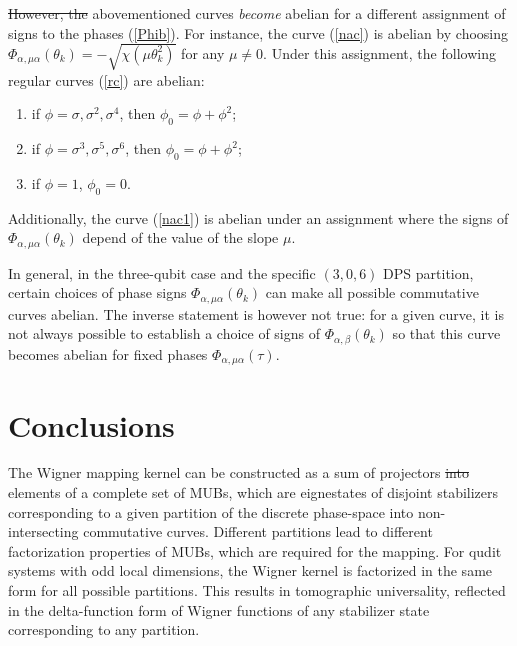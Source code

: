 \documentclass[quantumrep,article,submit,pdftex,moreauthors]{Definitions/mdpi}
\providecommand{\DIFadd}[1]{{\protect\color{blue}\uwave{#1}}} %
\providecommand{\DIFdel}[1]{{\protect\color{red}\sout{#1}}}                      %
\providecommand{\DIFaddbegin}{} %
\providecommand{\DIFaddend}{} %
\providecommand{\DIFdelbegin}{} %
\providecommand{\DIFdelend}{} %
\begin{document}
\DIFdelbegin \DIFdel{However, the }\DIFdelend \DIFaddbegin \DIFadd{The }\DIFaddend abovementioned curves \textit{become} abelian for a different assignment of
signs to the phases (\ref{Phib}). For instance, the curve (\ref{nac}) is abelian
by choosing $\Phi_{\alpha,\mu \alpha }(\theta_{k}) = -\sqrt{\chi\left(\mu
\theta_{k}^{2}\right)}$ for any $\mu \neq 0$. Under this assignment, the
following regular curves (\ref{rc}) are abelian:

\begin{enumerate}
  \item if $\phi = \sigma, \sigma^{2}, \sigma^{4}$, then $\phi_{0} = \phi +
    \phi^{2}$;

\DIFaddbegin 

  \DIFaddend \item if $\phi = \sigma^{3}, \sigma^{5}, \sigma^{6}$, then $\phi_{0} = \phi +
    \phi^{2}$;

\DIFaddbegin 

  \DIFaddend \item if $\phi = 1$, $\phi_{0} = 0$.
\end{enumerate}

Additionally, the curve (\ref{nac1}) is abelian under an assignment where the
signs of $\Phi_{\alpha,\mu \alpha}(\theta_{k})$ depend of the value of the slope
$\mu$.

In general, in the three-qubit case and the specific $(3,0,6)$ DPS partition,
certain choices of phase signs $\Phi_{\alpha,\mu \alpha}(\theta_{k})$ can make
all possible commutative curves abelian. The inverse statement is however not
true: for a given curve, it is not always possible to establish a choice of
signs of $\Phi_{\alpha,\beta }(\theta_{k})$ so that this curve becomes abelian
for fixed phases $\Phi_{\alpha,\mu \alpha}(\tau)$.


\DIFaddbegin 

\DIFaddend \section{Conclusions}

The Wigner mapping kernel can be constructed as a sum of projectors \DIFdelbegin \DIFdel{into
}\DIFdelend \DIFaddbegin \DIFadd{onto
}\DIFaddend elements of a complete set of MUBs, which are eignestates of disjoint
stabilizers corresponding to a given partition of the discrete phase-space into
non-intersecting commutative curves. Different partitions lead to different
factorization properties of MUBs, which are required for the mapping. For qudit
systems with odd local dimensions, the Wigner kernel is factorized in the same
form for all possible partitions. This results in tomographic universality,
reflected in the delta-function form of Wigner functions of any stabilizer state
corresponding to any partition.
\end{document}
